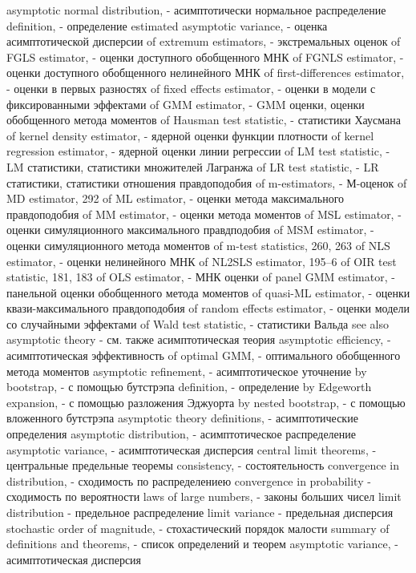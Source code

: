 asymptotic normal distribution, - асимптотически нормальное распределение
definition, - определение
estimated asymptotic variance, - оценка асимптотической дисперсии
of extremum estimators, - экстремальных оценок
of FGLS estimator, - оценки доступного обобщенного МНК
of FGNLS estimator, - оценки доступного обобщенного нелинейного МНК
of first-differences estimator, - оценки в первых разностях
of fixed effects estimator, - оценки в модели с фиксированными эффектами
of GMM estimator, - GMM оценки, оценки обобщенного метода моментов
of Hausman test statistic, - статистики Хаусмана
of kernel density estimator, - ядерной оценки функции плотности
of kernel regression estimator, - ядерной оценки линии регрессии 
of LM test statistic, - LM статистики, статистики множителей Лагранжа
of LR test statistic, - LR статистики, статистики отношения правдоподобия
of m-estimators, - М-оценок
of MD estimator, 292
of ML estimator, - оценки метода максимального правдоподобия
of MM estimator, - оценки метода моментов
of MSL estimator, - оценки симуляционного максимального правдподобия
of MSM estimator, - оценки симуляционного метода моментов
of m-test statistics, 260, 263 
of NLS estimator, - оценки нелинейного МНК
of NL2SLS estimator, 195–6
of OIR test statistic, 181, 183
of OLS estimator, - МНК оценки 
of panel GMM estimator, - панельной оценки обобщенного метода моментов
of quasi-ML estimator, - оценки квази-максимального правдоподобия
of random effects estimator, - оценки модели со случайными эффектами 
of Wald test statistic, - статистики Вальда
see also asymptotic theory - см. также асимптотическая теория
asymptotic efficiency, - асимптотическая эффективность
of optimal GMM, - оптимального обобщенного метода моментов
asymptotic refinement, - асимптотическое уточнение
by bootstrap, - с помощью бутстрэпа 
definition, - определение
by Edgeworth expansion, - с помощью разложения Эджуорта
by nested bootstrap, - с помощью вложенного бутстрэпа
asymptotic theory definitions, - асимптотические определения
asymptotic distribution, - асимптотическое распределение 
asymptotic variance, - асимптотическая дисперсия
central limit theorems, - центральные предельные теоремы 
consistency, - состоятельность
convergence in distribution, - сходимость по распределениею 
convergence in probability - сходимость по вероятности
laws of large numbers, - законы больших чисел 
limit distribution - предельное распределение
limit variance - предельная дисперсия
stochastic order of magnitude, - стохастический порядок малости 
summary of definitions and theorems, - список определений и теорем
asymptotic variance, - асимптотическая дисперсия 
